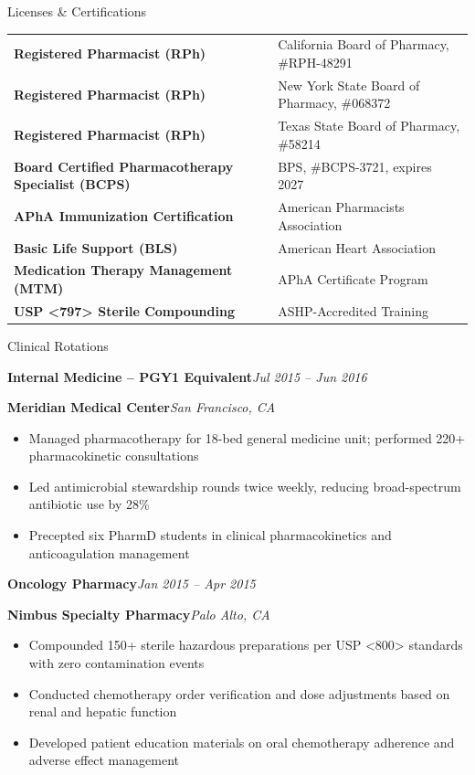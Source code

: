 \documentclass[11pt,letterpaper]{article}
\newcommand{\rotationentry}[4]{%
  \textbf{#1}\hfill\textit{#2}\par
  \textbf{#3}\hfill\textit{#4}\par\vspace{2pt}%
}
\begin{document}
\begin{sectionbox}
  Licenses \& Certifications
\end{sectionbox}

\begin{tabular}{@{}p{}p{}@{}}
  \textbf{Registered Pharmacist (RPh)} & California Board of Pharmacy, \#RPH-48291 \\
  \textbf{Registered Pharmacist (RPh)} & New York State Board of Pharmacy, \#068372 \\
  \textbf{Registered Pharmacist (RPh)} & Texas State Board of Pharmacy, \#58214 \\
  \textbf{Board Certified Pharmacotherapy Specialist (BCPS)} & BPS, \#BCPS-3721, expires 2027 \\
  \textbf{APhA Immunization Certification} & American Pharmacists Association \\
  \textbf{Basic Life Support (BLS)} & American Heart Association \\
  \textbf{Medication Therapy Management (MTM)} & APhA Certificate Program \\
  \textbf{USP \textless{}797\textgreater{} Sterile Compounding} & ASHP-Accredited Training \\
\end{tabular}

\begin{sectionbox}
  Clinical Rotations
\end{sectionbox}

\rotationentry{Internal Medicine -- PGY1 Equivalent}{Jul 2015 -- Jun 2016}{Meridian Medical Center}{San Francisco, CA}
\begin{itemize}
  \item Managed pharmacotherapy for 18-bed general medicine unit; performed 220+ pharmacokinetic consultations
  \item Led antimicrobial stewardship rounds twice weekly, reducing broad-spectrum antibiotic use by 28\%
  \item Precepted six PharmD students in clinical pharmacokinetics and anticoagulation management
\end{itemize}

\rotationentry{Oncology Pharmacy}{Jan 2015 -- Apr 2015}{Nimbus Specialty Pharmacy}{Palo Alto, CA}
\begin{itemize}
  \item Compounded 150+ sterile hazardous preparations per USP \textless{}800\textgreater{} standards with zero contamination events
  \item Conducted chemotherapy order verification and dose adjustments based on renal and hepatic function
  \item Developed patient education materials on oral chemotherapy adherence and adverse effect management
\end{itemize}
\end{document}
